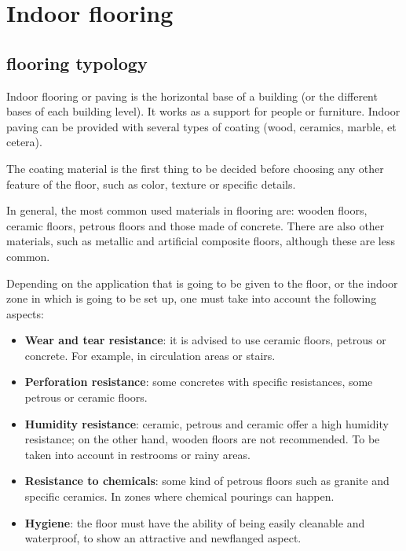 \chapter{Indoor flooring}

	\section{flooring typology}
	
	Indoor flooring or paving is the horizontal base of a building (or the different bases of each building level). It works as a support for people or furniture. Indoor paving can be provided with several types of coating (wood, ceramics, marble, et cetera).
	
	The coating material is the first thing to be decided before choosing any other feature of the floor, such as color, texture or specific details.
	
	In general, the most common used materials in flooring are: wooden floors, ceramic floors, petrous floors and those made of concrete. There are also other materials, such as metallic and artificial composite floors, although these are less common.
	
	Depending on the application that is going to be given to the floor, or the indoor zone in which is going to be set up, one must take into account the following aspects:
	
	\begin{itemize}
	\item \textbf{Wear and tear resistance}: it is advised to use ceramic floors, petrous or concrete. For example, in circulation areas or stairs.
	
	\item \textbf{Perforation resistance}: some concretes with specific resistances, some petrous or ceramic floors. 
	
	\item \textbf{Humidity resistance}: ceramic, petrous and ceramic offer a high humidity resistance; on the other hand, wooden floors are not recommended. To be taken into account in restrooms or rainy areas.
	
	\item \textbf{Resistance to chemicals}: some kind of petrous floors such as granite and specific ceramics. In zones where chemical pourings can happen.
	
	\item \textbf{Hygiene}: the floor must have the ability of being easily cleanable and waterproof, to show an attractive and newflanged aspect.
	\end{itemize}
	
